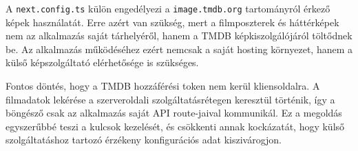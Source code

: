 A \texttt{next.config.ts} külön engedélyezi a \texttt{image.tmdb.org} tartományról érkező képek használatát. Erre azért van szükség, mert a filmposzterek és háttérképek nem az alkalmazás saját tárhelyéről, hanem a TMDB képkiszolgálójáról töltődnek be. Az alkalmazás működéséhez ezért nemcsak a saját hosting környezet, hanem a külső képszolgáltató elérhetősége is szükséges.

Fontos döntés, hogy a TMDB hozzáférési token nem kerül kliensoldalra. A filmadatok lekérése a szerveroldali szolgáltatásrétegen keresztül történik, így a böngésző csak az alkalmazás saját API route-jaival kommunikál. Ez a megoldás egyszerűbbé teszi a kulcsok kezelését, és csökkenti annak kockázatát, hogy külső szolgáltatáshoz tartozó érzékeny konfigurációs adat kiszivárogjon.
